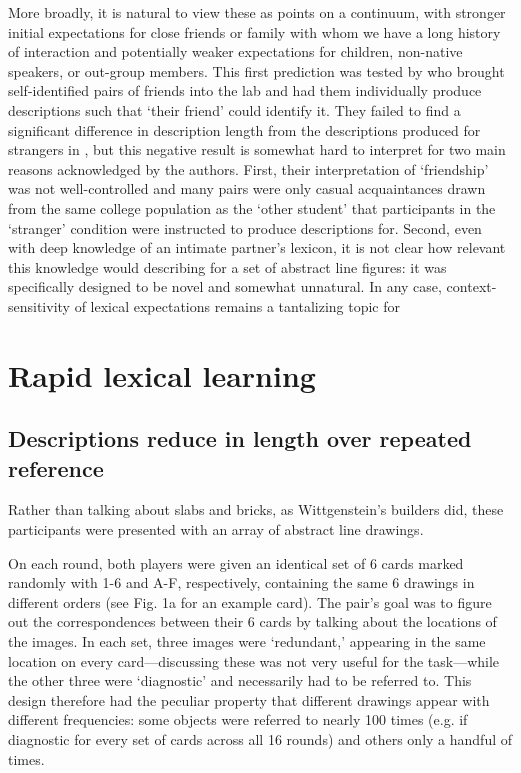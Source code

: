 \documentclass[11pt, floatsintext, jou]{apa6}
\begin{document}
More broadly, it is natural to view these as points on a continuum, with stronger initial expectations for close friends or family with whom we have a long history of interaction and potentially weaker expectations for children, non-native speakers, or out-group members. This first prediction was tested by  who brought self-identified pairs of friends into the lab and had them individually produce descriptions such that `their friend' could identify it. They failed to find a significant difference in description length from the descriptions produced for strangers in , but this negative result is somewhat hard to interpret for two main reasons acknowledged by the authors. First, their interpretation of `friendship' was not well-controlled and many pairs were only casual acquaintances drawn from the same college population as the `other student' that participants in the `stranger' condition were instructed to produce descriptions for. Second, even with deep knowledge of an intimate partner's lexicon, it is not clear how relevant this knowledge would describing for a set of abstract line figures: it was specifically designed to be novel and somewhat unnatural. In any case, context-sensitivity of lexical expectations remains a tantalizing topic for 

\section{Rapid lexical learning}

\subsection{Descriptions reduce in length over repeated reference}

Rather than talking about slabs and bricks, as Wittgenstein's builders did, these participants were presented with an array of abstract line drawings. %

On each round, both players were given an identical set of 6 cards marked randomly with 1-6 and A-F, respectively, containing the same 6 drawings in different orders (see Fig. 1a for an example card). The pair's goal was to figure out the correspondences between their 6 cards by talking about the locations of the images. In each set, three images were `redundant,' appearing in the same location on every card---discussing these was not very useful for the task---while the other three were `diagnostic' and necessarily had to be referred to. This design therefore had the peculiar property that different drawings appear with different frequencies: some objects were referred to nearly 100 times (e.g. if diagnostic for every set of cards across all 16 rounds) and others only a handful of times. 
\end{document}
